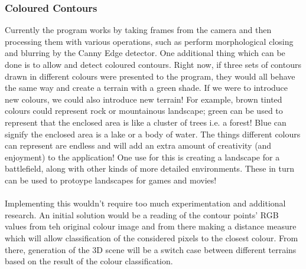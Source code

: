 \documentclass[11pt]{article}
\begin{document}
\subsubsection{Coloured Contours}
Currently the program works by taking frames from the camera and then   
processing them with various operations, such as perform morphological
closing and blurring by the Canny Edge detector. One additional thing 
which can be done is to allow and detect coloured contours. Right now,
if three sets of contours drawn in different colours were presented to
the program, they would all behave the same way and create a terrain
with a green shade. If we were to introduce new colours, we could also
introduce new terrain! For example, brown tinted colours could represent
rock or mountainous landscape; green can be used to represent that the 
enclosed area is like a cluster of trees i.e. a forest! Blue can signify
the enclosed area is a lake or a body of water. The things different
colours can represent are endless and will add an extra amount of creativity
(and enjoyment) to the application! One use for this is creating a 
landscape for a battlefield, along with other kinds of more 
detailed environments. These in turn can be used to protoype 
landscapes for games and movies!\\
\\
Implementing this wouldn't require too much experimentation and
additional research. An initial solution would be a
reading of the contour points' RGB values from teh original colour image
and from there making a distance 
measure which will allow classification of the considered pixels to the 
closest colour. From there, generation of the 3D scene will be a switch case 
between different terrains based on the result of the colour classification.
\end{document}
